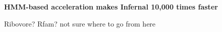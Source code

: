\documentclass[landscape]{slides}
\begin{document}
\begin{slide}
\begin{center}

\textbf{HMM-based acceleration makes Infernal 10,000 times faster}

\end{center}
\medskip


\vfill 
\end{slide}
\begin{slide}
Ribovore? Rfam? not sure where to go from here
\end{slide}
\end{document}
